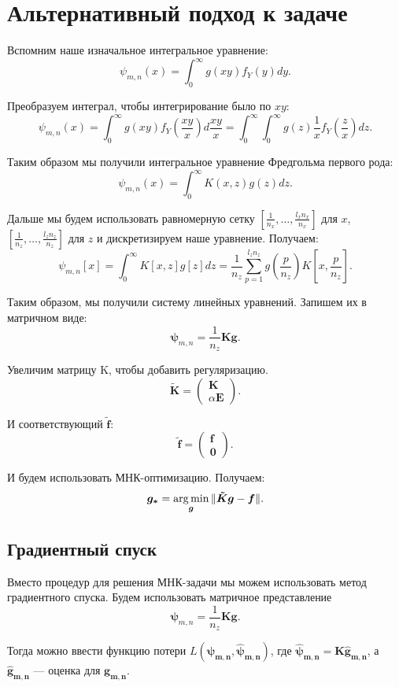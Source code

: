 \documentclass[../paper.tex]{subfiles}
\begin{document}
\section{Альтернативный подход к задаче}
Вспомним наше изначальное интегральное уравнение:
\[
    \psi_{m,n}(x) = \int_{0}^{\infty} g(xy) f_Y(y) dy  
.\]

Преобразуем интеграл, чтобы интегрирование было по $xy$:
\[
    \psi_{m,n}(x) = \int_{0}^{\infty}  g(xy) f_Y(\frac{xy}{x}) d\frac{xy}{x}
    = \int_{0}^{\infty} \int_{0}^{\infty} g(z) \frac{1}{x} f_Y(\frac{z}{x}) dz  
.\]

Таким образом мы получили интегральное уравнение Фредгольма первого рода:
\[
    \psi_{m,n}(x) = \int_{0}^{\infty} K(x, z) g(z) dz 
.\]

Дальше мы будем использовать равномерную сетку $\left[\frac{1}{n_x}, \dots, \frac{l_x n_x}{n_x}\right]$ для $x$, $\left[\frac{1}{n_z}, \dots, \frac{l_z n_z}{n_z}\right]$ для $z$ 
и дискретизируем наше уравнение. Получаем:
\[
    \psi_{m,n}[x] = \int_{0}^{\infty} K[x,z] g[z] dz = \frac{1}{n_z} \sum_{p=1}^{l_z n_z} g\left(\frac{p}{n_z}\right) K\left[x, \frac{p}{n_z}\right]
.\]

Таким образом, мы получили систему линейных уравнений. Запишем их в матричном виде:
\[
    \bm{\psi}_{m,n} = \frac{1}{n_z} \bm{K} \bm{g}
.\]

Увеличим матрицу K, чтобы добавить регуляризацию.
\[
    \bm{\tilde K} = 
    \begin{pmatrix}
        \bm{K} \\
        \alpha \bm{E}
    \end{pmatrix}
.\]

И соответствующий $\bm{\tilde f}$:
\[
    \bm{\tilde f} = 
    \begin{pmatrix}
        \bm{f} \\
        \bm{0}
    \end{pmatrix}
.\]

И будем использовать МНК-оптимизацию. Получаем:
\[
    \bm{g_*} = \operatorname*{arg\,min}_{\bm{g}} \| \bm{\tilde K} \bm{g} - \bm{f} \|
.\]
%
\subsection{Градиентный спуск}
Вместо процедур для решения МНК-задачи мы можем использовать метод градиентного
спуска. Будем использовать матричное представление
\[
  \bm{\psi}_{m,n} = \frac{1}{n_z} \bm{K} \bm{g}
.\]

Тогда можно ввести функцию потери $L(\bm{\psi_{m,n}}, \bm{\hat{\psi}_{m,n}})$,
где $\bm{\hat{\psi}_{m,n}} = \bm{K} \bm{\hat{g}_{m,n}}$, а $\bm{\hat{g}_{m,n}}$ ---
оценка для $\bm{g_{m,n}}$.
\end{document}
